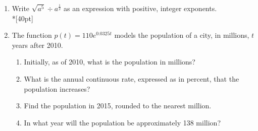 \documentclass[12pt, oneside]{article}
\begin{document}
\begin{enumerate}
\item Write $\sqrt{a^5} \div a^{\frac{1}{2}}$ as an expression with positive, integer exponents.\\*[40pt]
    \begin{flushright}[3]\end{flushright}

\item The function $p(t)=110e^{0.0325t}$ models the population of a city, in millions, $t$ years after 2010.
\begin{enumerate}
    \item Initially, as of 2010, what is the population in millions?%
        \begin{flushright}[1]\end{flushright}
    \item What is the annual continuous rate, expressed as in percent, that the population increases?%
        \begin{flushright}[1]\end{flushright}
    \item Find the population in 2015, rounded to the nearest million.\\[60pt]
        \begin{flushright}[2]\end{flushright}
    \item In what year will the population be approximately 138 million?
        \begin{flushright}[2]\end{flushright}
\end{enumerate}



\end{enumerate}
\end{document}
